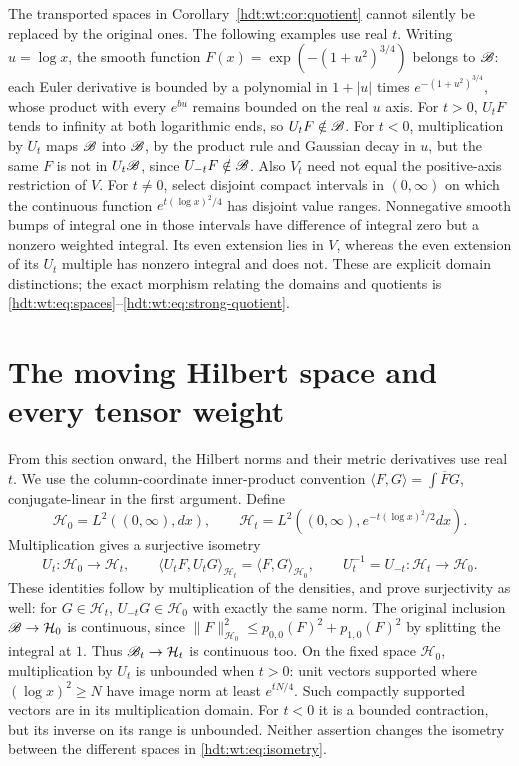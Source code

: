 \documentclass[11pt]{article}
\begin{document}
The transported spaces in Corollary~\ref{hdt:wt:cor:quotient} cannot silently be
replaced by the original ones.  The following examples use real
$t$.  Writing $u=\log x$,
the smooth function
$F(x)=\exp(-(1+u^2)^{3/4})$ belongs to $\mathscr B$: each Euler
derivative is bounded by a polynomial in $1+|u|$ times
$e^{-(1+u^2)^{3/4}}$, whose product with every $e^{b u}$
remains bounded on the real $u$ axis.
For $t>0$, $U_tF$ tends to infinity at both logarithmic ends,
so $U_tF\notin\mathscr B$.  For $t<0$, multiplication by $U_t$ maps
$\mathscr B$ into $\mathscr B$, by the product rule and Gaussian decay in $u$,
but the same $F$ is not in $U_t\mathscr B$, since $U_{-t}F\notin\mathscr B$.
Also $V_t$ need not equal the positive-axis restriction of $V$.
For $t\ne0$, select disjoint compact intervals in $(0,\infty)$
on which the continuous function $e^{t(\log x)^2/4}$ has disjoint
value ranges.  Nonnegative smooth bumps of integral one in those
intervals have difference of integral zero but a nonzero weighted
integral.  Its even extension lies in $V$, whereas the even
extension of its $U_t$ multiple has nonzero integral and does not.
These are explicit domain distinctions; the exact morphism
relating the domains and quotients is
\eqref{hdt:wt:eq:spaces}--\eqref{hdt:wt:eq:strong-quotient}.

\section{The moving Hilbert space and every tensor weight}
\label{hdt:wt:sec:Hilbert}

From this section onward, the Hilbert norms and their metric
derivatives use real $t$.  We use the column-coordinate inner-product convention
$\langle F,G\rangle=\int\overline F G$, conjugate-linear in
the first argument.  Define
\begin{equation}\label{hdt:wt:eq:Hilbert}
 \mathcal H_0=L^2((0,\infty),dx),\qquad
 \mathcal H_t=L^2((0,\infty),e^{-t(\log x)^2/2}dx).
\end{equation}
Multiplication gives a surjective isometry
\begin{equation}\label{hdt:wt:eq:isometry}
 U_t:\mathcal H_0\longrightarrow \mathcal H_t,\qquad
 \langle U_tF,U_tG\rangle_{\mathcal H_t}=\langle F,G\rangle_{\mathcal H_0},
 \qquad U_t^{-1}=U_{-t}:\mathcal H_t\longrightarrow \mathcal H_0.
\end{equation}
These identities follow by multiplication of the densities,
and prove surjectivity as well: for $G\in \mathcal H_t$, $U_{-t}G\in \mathcal H_0$
with exactly the same norm.  The original inclusion $\mathscr B\to \mathcal H_0$
is continuous, since
$\|F\|_{\mathcal H_0}^2\leq p_{0,0}(F)^2+p_{1,0}(F)^2$ by splitting
the integral at $1$.  Thus $\mathscr B_t\to \mathcal H_t$ is continuous too.
On the fixed space $\mathcal H_0$, multiplication by $U_t$ is unbounded
when $t>0$: unit vectors supported where $(\log x)^2\geq N$
have image norm at least $e^{tN/4}$.  Such compactly supported
vectors are in its multiplication domain.  For $t<0$ it is a
bounded contraction, but its inverse on its range is unbounded.
Neither assertion changes the isometry between the different
spaces in \eqref{hdt:wt:eq:isometry}.
\end{document}
